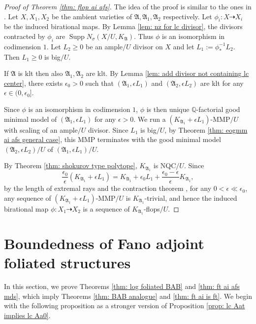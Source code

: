 \documentclass[12pt]{amsart}
\numberwithin{equation}{section}
\newcommand{\Supp}{\operatorname{Supp}}
\newcommand{\Aa}{{\mathfrak{A}}}
\theoremstyle{definition}
\theoremstyle{definition}
\theoremstyle{definition}
\begin{document}
\begin{proof}[Proof of Theorem \ref{thm: flop ai afs}]
The idea of the proof is similar to the ones in \cite{Kaw08,CLW24}. Let $X,X_1,X_2$ be the ambient varieties of $\Aa,\Aa_1,\Aa_2$ respectively. Let $\phi_i: X\dashrightarrow X_i$ be the induced birational maps. By Lemma \ref{lem: nz for lc divisor}, the divisors contracted by $\phi_i$ are $\Supp N_{\sigma}(X/U,K_{\Aa})$. Thus $\phi$ is an isomorphism in codimension $1$. Let $L_2\geq 0$ be an ample$/U$ divisor on $X$ and let $L_1:=\phi^{-1}_*L_2$. Then $L_1\geq 0$ is big$/U$. 

If $\Aa$ is klt then also $\Aa_1,\Aa_2$ are klt. By Lemma \ref{lem: add divisor not containing lc center}, there exists $\epsilon_0>0$ such that $(\Aa_1,\epsilon L_1)$ and $(\Aa_2,\epsilon L_2)$ are klt for any $\epsilon\in (0,\epsilon_0]$.

 Since $\phi$ is an isomorphism in codimension $1$, $\phi$ is then unique $\mathbb Q$-factorial good minimal model of $(\Aa_1,\epsilon L_1)$ for any $\epsilon>0$. We run a $(K_{\Aa_1}+\epsilon L_1)$-MMP$/U$ with scaling of an ample$/U$ divisor. Since $L_1$ is big$/U$, by Theorem \ref{thm: eogmm ai afs general case}, this MMP terminates with the good minimal model $(\Aa_2,\epsilon L_2)/U$ of $(\Aa_1,\epsilon L_1)/U$.

By Theorem \ref{thm: shokurov type polytope}, $K_{\Aa_1}$ is NQC$/U$. Since
$$\frac{\epsilon_0}{\epsilon}(K_{\Aa_1}+\epsilon L_1)=K_{\Aa_1}+\epsilon_0L_1+\frac{\epsilon_0-\epsilon}{\epsilon}K_{\Aa_1},$$
by the length of extremal rays and the contraction theorem \cite[Theorem 1.3(2), Theorem 1.4(2)]{CHLMSSX24}, for any $0<\epsilon\ll\epsilon_0$, any sequence of $(K_{\Aa_1}+\epsilon L_1)$-MMP$/U$ is $K_{\Aa_1}$-trivial, and hence the induced birational map $\phi: X_1\dashrightarrow X_2$ is a sequence of $K_{\Aa_1}$-flops$/U$.
\end{proof}

\section{Boundedness of Fano adjoint foliated structures}\label{sec: bdd fano}

In this section, we prove Theorems \ref{thm: log foliated BAB} and \ref{thm: ft ai afs mds}, which imply Theorems \ref{thm: BAB analogue} and \ref{thm: ft ai is ft}. We begin with the following proposition as a stronger version of Proposition \ref{prop: lc Aat implies lc Aa0}.
\end{document}
